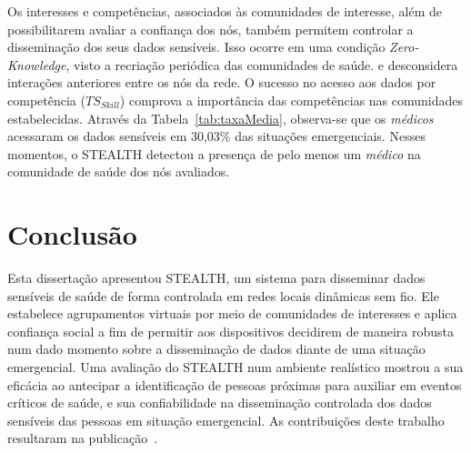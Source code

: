 \documentclass[12pt]{article}
\begin{document}
Os interesses e competências, associados às comunidades de interesse, além de possibilitarem avaliar a confiança dos nós, também permitem controlar a disseminação dos seus dados sensíveis. Isso ocorre em uma condição \textit{Zero-Knowledge},
visto a recriação periódica das comunidades de saúde.
e desconsidera interações anteriores entre os nós da rede. O sucesso no acesso aos dados por competência ($TS_{Skill}$) comprova a importância das competências nas comunidades estabelecidas. Através da Tabela~\ref{tab:taxaMedia}, observa-se que os \textit{médicos} acessaram os dados sensíveis em 30,03\% das situações emergenciais. Nesses momentos, o \mbox{STEALTH} detectou a presença de pelo menos um \textit{médico} na comunidade de saúde dos nós avaliados.

\vspace{-0.2cm}

\section{Conclusão}
\label{sec:conc}

Esta dissertação apresentou \mbox{STEALTH}, um sistema para disseminar dados sensíveis de saúde de forma controlada em redes locais dinâmicas sem fio. Ele estabelece agrupamentos virtuais por meio de comunidades de interesses e aplica confiança social a fim de permitir aos dispositivos decidirem de maneira robusta num dado momento sobre a disseminação de dados diante de uma situação emergencial. Uma avaliação do \mbox{STEALTH} num ambiente realístico mostrou a sua eficácia ao antecipar a identificação de pessoas próximas para auxiliar em eventos críticos de saúde, e sua confiabilidade na disseminação controlada dos dados sensíveis das pessoas em situação emergencial. As contribuições deste trabalho resultaram na publicação~\cite{batista2019sbseg}.

\small


\end{document}
